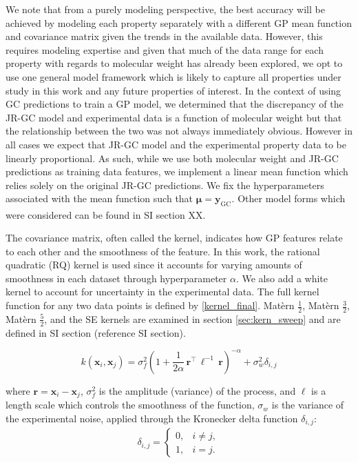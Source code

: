 \documentclass[journal=jacsat,manuscript=article]{achemso}
\newcommand{\xvec}{\ensuremath{\mathbf{x}}}
\newcommand{\Ygcvec}[1][]{\ensuremath{\mathbf{y}_{\text{GC}_{#1}}}}
\begin{document}
We note that from a purely modeling perspective, the best accuracy will be achieved by modeling each property separately with a different GP mean function and covariance matrix given the trends in the available data. However, this requires modeling expertise and given that much of the data range for each property with regards to molecular weight has already been explored, we opt to use one general model framework which is likely to capture all properties under study in this work and any future properties of interest. In the context of using GC predictions to train a GP model, we determined that the discrepancy of the JR-GC model and experimental data is a function of molecular weight but that the relationship between the two was not always immediately obvious. However in all cases we expect that JR-GC model and the experimental property data to be linearly proportional. As such, while we use both molecular weight and JR-GC predictions as training data features, we implement a linear mean function which relies solely on the original JR-GC predictions. We fix the hyperparameters associated with the mean function such that $\boldsymbol{\mu} = \Ygcvec$.  Other model forms which were considered can be found in SI section XX. 

The covariance matrix, often called the kernel, indicates how GP features relate to each other and the smoothness of the feature. In this work, the rational quadratic (RQ) kernel is used since it accounts for varying amounts of smoothness in each dataset through hyperparameter $\alpha$. We also add a white kernel to account for uncertainty in the experimental data. The full kernel function for any two data points is defined by \eqref{kernel_final}. Mat\`ern $\frac{1}{2}$, Mat\`ern $\frac{3}{2}$, Mat\`ern $\frac{5}{2}$, and the SE kernels are examined in section \ref{sec:kern_sweep} and are defined in SI section (reference SI section).

\begin{equation}
    k(\xvec_i,\xvec_j) = \sigma_f^2 \left(1 +\frac{1}{2 \alpha} \,\mathbf{r}^\intercal \,{\ell}^{-1} \,\mathbf{r} \right)^{-\alpha} + \sigma_w^2\delta_{i,j}
    \label{kernel_final}
\end{equation}

\noindent where  $\mathbf{r} = \xvec_i - \xvec_j$, $\sigma_f^2$ is the amplitude (variance) of the process, and $\ell$ is a length scale which controls the smoothness of the function, $\sigma_w$ is the variance of the experimental noise, applied through the Kronecker delta function $\delta_{i,j}$:
\begin{gather*}
    \delta_{i,j} = 
    \begin{cases}
        0, & i\neq j,\\
        1, & i= j.
    \end{cases}
\end{gather*}
\end{document}
